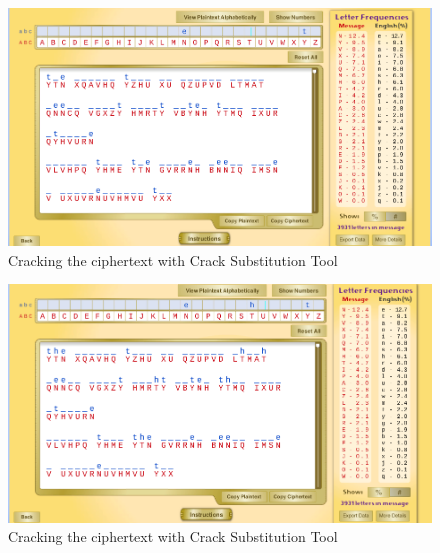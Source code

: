 \documentclass[12pt]{article}
\begin{document}
\begin{figure}[!ht]
    \begin{center}
        \includegraphics[scale=0.48]{c4.png}
    \end{center}{}
    \caption{Cracking the ciphertext with Crack Substitution Tool}
    \label{fig:c4}
\end{figure}



\begin{figure}[!ht]
    \begin{center}
        \includegraphics[scale=0.48]{c5.png}
    \end{center}{}
    \caption{Cracking the ciphertext with Crack Substitution Tool}
    \label{fig:c5}
\end{figure}
\end{document}
